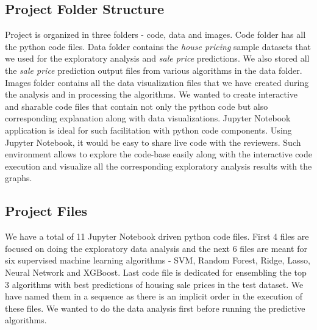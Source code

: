 \documentclass[sigconf]{acmart}
\begin{document}
	\subsection{Project Folder Structure}
	Project is organized in three folders - code, data and images. Code folder has all the python code files. Data folder contains the {\em house pricing} sample datasets that we used for the exploratory analysis and {\em sale price} predictions. We also stored all the {\em sale price} prediction output files from various algorithms in the data folder. Images folder contains all the data visualization files that we have created during the analysis and in processing the algorithms. We wanted to create interactive and sharable code files that contain not only the python code but also corresponding explanation along with data visualizations. Jupyter Notebook application is ideal for such facilitation with python code components. Using Jupyter Notebook, it would be easy to share live code with the reviewers. Such environment allows to explore the code-base easily along with the interactive code execution and visualize all the corresponding exploratory analysis results with the graphs.
	
	\subsection{Project Files}
	We have a total of 11 Jupyter Notebook driven python code files. First 4 files are focused on doing the exploratory data analysis and the next 6 files are meant for six supervised machine learning algorithms - SVM, Random Forest, Ridge, Lasso, Neural Network and XGBoost. Last code file is dedicated for ensembling the top 3 algorithms with best predictions of housing sale prices in the test dataset. We have named them in a sequence as there is an implicit order in the execution of these files. We wanted to do the data analysis first before running the predictive algorithms. 
	
\end{document}
